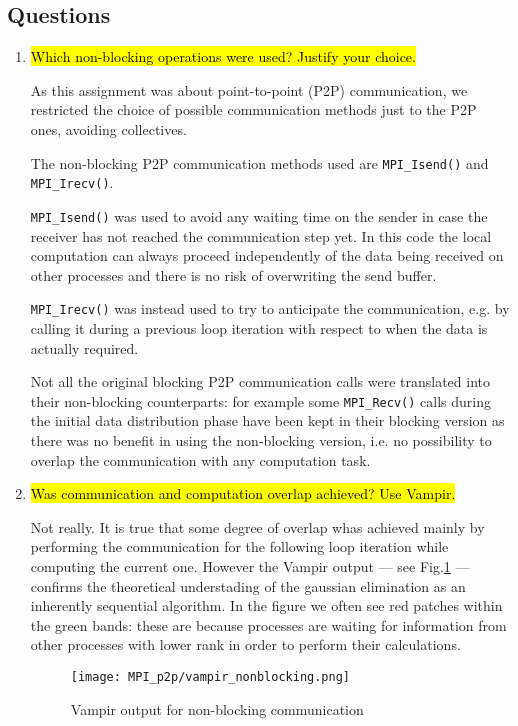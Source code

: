 \subsection{Questions}
\begin{enumerate}
	\item \hl{Which non-blocking operations were used? Justify your choice.}

	As this assignment was about point-to-point (P2P) communication, we restricted the choice of possible communication methods just to the P2P ones, avoiding collectives.

	The non-blocking P2P communication methods used are \verb!MPI_Isend()! and \verb!MPI_Irecv()!.

	\verb!MPI_Isend()! was used to avoid any waiting time on the sender in case the receiver has not reached the communication step yet. In this code the local computation can always proceed independently of the data being received on other processes and there is no risk of overwriting the send buffer.

	\verb!MPI_Irecv()! was instead used to try to anticipate the communication, e.g. by calling it during a previous loop iteration with respect to when the data is actually required.

	Not all the original blocking P2P communication calls were translated into their non-blocking counterparts: for example some \verb!MPI_Recv()! calls during the initial data distribution phase have been kept in their blocking version as there was no benefit in using the non-blocking version, i.e. no possibility to overlap the communication with any computation task.

	\item \hl{Was communication and computation overlap achieved? Use Vampir.}

	Not really. It is true that some degree of overlap whas achieved mainly by performing the communication for the following loop iteration while computing the current one. However the Vampir output --- see Fig.\ref{fig:vampir_nonblocking} --- confirms the theoretical understading of the gaussian elimination as an inherently sequential algorithm. In the figure we often see red patches within the green bands: these are because processes are waiting for information from other processes with lower rank in order to perform their calculations.

	\begin{figure}[h] %
	\begin{center}
		\texttt{[image: MPI\_p2p/vampir\_nonblocking.png]}
		\caption{Vampir output for non-blocking communication}
		\label{fig:vampir_nonblocking}
	\end{center}
	\end{figure}


\end{enumerate}
